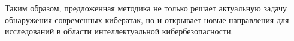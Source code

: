 Таким образом, предложенная методика не только решает актуальную задачу обнаружения современных кибератак, но и открывает новые направления для исследований в области интеллектуальной кибербезопасности.

